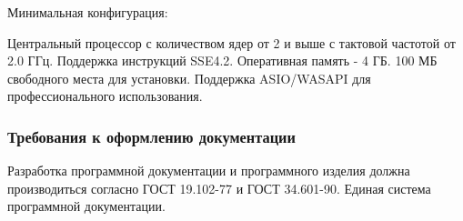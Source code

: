 Минимальная конфигурация:

Центральный процессор с количеством ядер от 2 и выше с тактовой частотой от 2.0 ГГц. Поддержка инструкций SSE4.2. Оперативная память - 4 ГБ. 100 МБ свободного места для установки. Поддержка ASIO/WASAPI для профессионального использования.

\subsubsection{Требования к оформлению документации}

Разработка программной документации и программного изделия должна производиться согласно ГОСТ 19.102-77 и ГОСТ 34.601-90. Единая система программной документации.